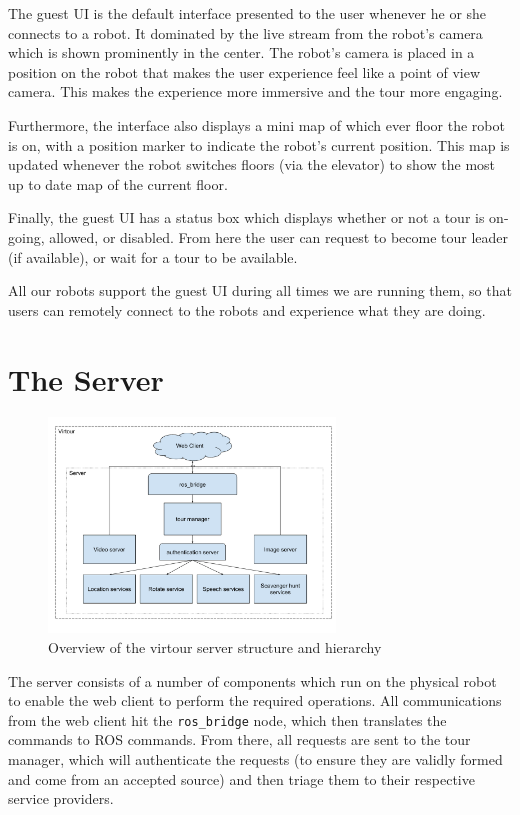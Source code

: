 \documentclass[
  oneside,
  11pt, a4paper,
  footinclude=true,
  headinclude=true,
  cleardoublepage=empty
]{article}
\begin{document}
The guest UI is the default interface presented to the user whenever he or she
connects to a robot. It dominated by the live stream from the robot's camera
which is shown prominently in the center. The robot's camera is placed in a
position on the robot that makes the user experience feel like a point of view
camera. This makes the experience more immersive and the tour more engaging.

Furthermore, the interface also displays a mini map of which ever floor the
robot is on, with a position marker to indicate the robot's current position.
This map is updated whenever the robot switches floors (via the elevator) to
show the most up to date map of the current floor.

Finally, the guest UI has a status box which displays whether or not a tour is
on-going, allowed, or disabled. From here the user can request to become tour
leader (if available), or wait for a tour to be available.

All our robots support the guest UI during all times we are running them, so
that users can remotely connect to the robots and experience what they are
doing.

\section{The Server}

\begin{figure}
\centering
\includegraphics[width=3in]{virtour_server}
\caption{Overview of the virtour server structure and hierarchy}
\end{figure}

The server consists of a number of components which run on the physical robot
to enable the web client to perform the required operations. All communications
from the web client hit the \verb|ros_bridge| node, which then translates the
commands to ROS commands. From there, all requests are sent to the tour
manager, which will authenticate the requests (to ensure they are validly
formed and come from an accepted source) and then triage them to their
respective service providers.
\end{document}
